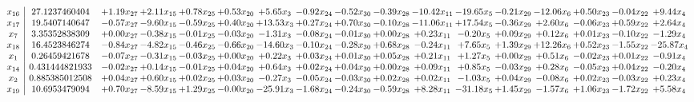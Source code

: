 \documentclass[9pt]{article}
\begin{document}
 \[\begin{array}{c| c c@{\hskip 2pt} c@{\hskip 2pt} c@{\hskip 2pt} c@{\hskip 2pt} c@{\hskip 2pt} c@{\hskip 2pt} c@{\hskip 2pt} c@{\hskip 2pt} c@{\hskip 2pt} c@{\hskip 2pt} c@{\hskip 2pt} c@{\hskip 2pt} c@{\hskip 2pt} c@{\hskip 2pt} c@{\hskip 2pt} }
 x_{16}   &  27.1237460404 & +  1.19 x_{27} & +  2.11 x_{15} & +  0.78 x_{25} & +  0.53 x_{20} & +  5.65 x_{3} & -0.92 x_{24} & -0.52 x_{30} & -0.39 x_{28} & -10.42 x_{11} & -19.65 x_{5} & -0.21 x_{29} & -12.06 x_{6} & +  0.50 x_{23} & -0.04 x_{22} & +  9.44 x_{4}\\
 x_{17}   &  19.5407140647 & -0.57 x_{27} & -9.60 x_{15} & -0.59 x_{25} & +  0.40 x_{20} & + 13.53 x_{3} & +  0.27 x_{24} & +  0.70 x_{30} & -0.10 x_{28} & -11.06 x_{11} & + 17.54 x_{5} & -0.36 x_{29} & +  2.60 x_{6} & -0.06 x_{23} & +  0.59 x_{22} & +  2.64 x_{4}\\
 x_{7}   &  3.35352838309 & +  0.00 x_{27} & -0.38 x_{15} & -0.01 x_{25} & -0.03 x_{20} & -1.31 x_{3} & -0.08 x_{24} & -0.01 x_{30} & +  0.00 x_{28} & +  0.23 x_{11} & -0.20 x_{5} & +  0.09 x_{29} & +  0.12 x_{6} & +  0.01 x_{23} & -0.10 x_{22} & -1.29 x_{4}\\
 x_{18}   &  16.4523846274 & -0.84 x_{27} & -4.82 x_{15} & -0.46 x_{25} & -0.66 x_{20} & -14.60 x_{3} & -0.10 x_{24} & -0.28 x_{30} & +  0.68 x_{28} & -0.24 x_{11} & +  7.65 x_{5} & +  1.39 x_{29} & + 12.26 x_{6} & +  0.52 x_{23} & -1.55 x_{22} & -25.87 x_{4}\\
 x_{1}   &  0.26459421678 & -0.07 x_{27} & -0.31 x_{15} & -0.03 x_{25} & +  0.00 x_{20} & +  0.22 x_{3} & +  0.03 x_{24} & +  0.01 x_{30} & +  0.05 x_{28} & +  0.21 x_{11} & +  1.27 x_{5} & +  0.00 x_{29} & +  0.51 x_{6} & -0.02 x_{23} & +  0.01 x_{22} & -0.91 x_{4}\\
 x_{14}   &  0.431444821933 & -0.02 x_{27} & +  0.14 x_{15} & -0.01 x_{25} & +  0.04 x_{20} & +  0.64 x_{3} & +  0.02 x_{24} & +  0.04 x_{30} & +  0.00 x_{28} & +  0.09 x_{11} & +  0.85 x_{5} & -0.03 x_{29} & +  0.28 x_{6} & -0.05 x_{23} & +  0.04 x_{22} & -0.20 x_{4}\\
 x_{2}   &  0.885385012508 & +  0.04 x_{27} & +  0.60 x_{15} & +  0.02 x_{25} & +  0.03 x_{20} & -0.27 x_{3} & -0.05 x_{24} & -0.03 x_{30} & +  0.02 x_{28} & +  0.02 x_{11} & -1.03 x_{5} & +  0.04 x_{29} & -0.08 x_{6} & +  0.02 x_{23} & -0.03 x_{22} & +  0.23 x_{4}\\
 x_{19}   &  10.6953479094 & +  0.70 x_{27} & -8.59 x_{15} & +  1.29 x_{25} & -0.00 x_{20} & -25.91 x_{3} & -1.68 x_{24} & -0.24 x_{30} & -0.59 x_{28} & +  8.28 x_{11} & -31.18 x_{5} & +  1.45 x_{29} & -1.57 x_{6} & +  1.06 x_{23} & -1.72 x_{22} & +  5.58 x_{4}\\

\end{array}\]
\end{document}

